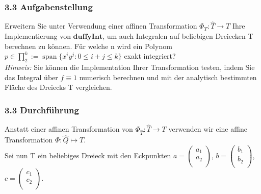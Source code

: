 \documentclass[a4paper,11pt,bibliography=totoc,listof=totoc,headinclude=true,cleardoublepage=empty,oneside]{scrbook}
\DeclareMathOperator*{\SPAN}{span}
\begin{document}
\subsubsection{3.3 Aufgabenstellung}

Erweitern Sie unter Verwendung einer affinen Transformation $\Phi_T:\hat{T} \to T$ Ihre Implementierung von $\textbf{duffyInt}$, um auch Integralen auf beliebigen Dreiecken T berechnen zu können. 
Für welche n wird ein Polynom $ p \in \prod_{2}^k:=\SPAN\{x^iy^j:0 \leq i+j\leq k \} $ exakt integriert? \\

\noindent \textit{Hinweis:} Sie können die Implementation Ihrer Transformation testen, indem Sie das Integral über $f \equiv1$ numerisch berechnen und mit der analytisch bestimmten Fläche des Dreiecks T vergleichen.


\subsubsection{3.3 Durchführung}

Anstatt einer affinen Transformation von $ \Phi_{\hat{T}}:\hat{T} \to T$ verwenden wir eine affine Transformation $\Phi:\hat{Q} \mapsto T$. \\

\noindent Sei nun T ein beliebiges Dreieck mit den Eckpunkten $a=\left(\begin{array}{ccc}
				a_1 \\
				a_2\\
		\end{array}\right)$, 
$b=\left(\begin{array}{ccc}
				b_1 \\
				b_2\\
		\end{array}\right)$,
$c=\left(\begin{array}{ccc}
				c_1 \\
				c_2\\
		\end{array}\right)$.
		
\vspace{4mm}\hspace{3.6cm}
\vspace{4mm}
\end{document}
